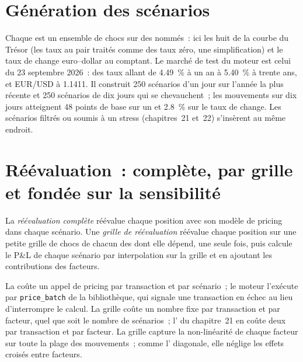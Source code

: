 \label{lst:rc:build-a-risk-engine:register}

\section{Génération des scénarios}

Chaque  est un ensemble de chocs sur des  nommés~: ici les huit  de la courbe du Trésor
(les taux au pair traités comme des taux zéro, une simplification) et le taux de change euro--dollar au comptant. Le marché de test du moteur
est celui du 23 septembre 2026~: des taux allant de 4.49~\% à un an à 5.40~\% à trente ans,
et EUR/USD à 1.1411. Il construit 250 scénarios d'un jour sur l'année la plus récente et 250 scénarios de dix jours qui se chevauchent~;
les mouvements sur dix jours atteignent 48 points de base sur un  et 2.8~\% sur le taux de change.
Les scénarios filtrés ou soumis à un stress (chapitres~21 et~22) s'insèrent au même endroit.

\section{Réévaluation~: complète, par grille et fondée sur la sensibilité}

\begin{definition}\label{def:rc:build-a-risk-engine:reval}
La \emph{réévaluation complète} réévalue chaque position avec son modèle de pricing dans chaque
scénario. Une \emph{grille de réévaluation} réévalue chaque position sur une petite grille de chocs
de chacun des  dont elle dépend, une seule fois, puis calcule le P\&L de chaque scénario par interpolation sur la grille
et en ajoutant les contributions des facteurs.
\end{definition}

La  coûte un appel de pricing par transaction et par scénario~; le moteur l'exécute par
\texttt{price\_batch} de la bibliothèque, qui signale une transaction en échec au lieu d'interrompre le calcul. La grille coûte un nombre fixe par transaction
et par facteur, quel que soit le nombre de scénarios~; l' du chapitre~21 en coûte deux par
transaction et par facteur. La grille capture la non-linéarité de chaque facteur sur toute la plage des mouvements~; comme
l' diagonale, elle néglige les effets croisés entre facteurs.

